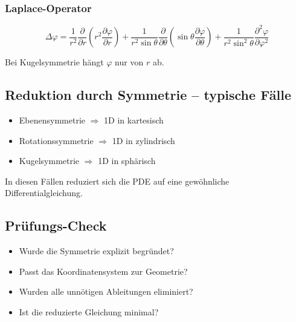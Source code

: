 \documentclass[a4paper]{article}
\begin{document}
\subsubsection{Laplace-Operator}

\[
\Delta \varphi =
\frac{1}{r^2}\frac{\partial}{\partial r}
\left(r^2\frac{\partial \varphi}{\partial r}\right)
+\frac{1}{r^2\sin\theta}\frac{\partial}{\partial \theta}
\left(\sin\theta\frac{\partial \varphi}{\partial \theta}\right)
+\frac{1}{r^2\sin^2\theta}
\frac{\partial^2 \varphi}{\partial \varphi^2}
\]

\begin{merke}
Bei Kugelsymmetrie hängt $\varphi$ nur von $r$ ab.
\end{merke}

\subsection{Reduktion durch Symmetrie – typische Fälle}

\begin{schema}
\begin{itemize}
  \item Ebenensymmetrie $\Rightarrow$ 1D in kartesisch
  \item Rotationssymmetrie $\Rightarrow$ 1D in zylindrisch
  \item Kugelsymmetrie $\Rightarrow$ 1D in sphärisch
\end{itemize}
\end{schema}

In diesen Fällen reduziert sich die PDE auf eine gewöhnliche Differentialgleichung.

\subsection{Prüfungs-Check}

\begin{checkitem}
\begin{itemize}
  \item Wurde die Symmetrie explizit begründet?
  \item Passt das Koordinatensystem zur Geometrie?
  \item Wurden alle unnötigen Ableitungen eliminiert?
  \item Ist die reduzierte Gleichung minimal?
\end{itemize}
\end{checkitem}
\end{document}
